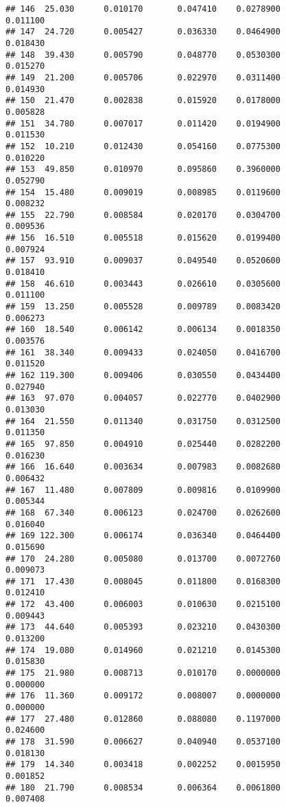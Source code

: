 \documentclass[
]{article}
\begin{document}
\begin{verbatim}
## 146  25.030      0.010170       0.047410    0.0278900          0.011100
## 147  24.720      0.005427       0.036330    0.0464900          0.018430
## 148  39.430      0.005790       0.048770    0.0530300          0.015270
## 149  21.200      0.005706       0.022970    0.0311400          0.014930
## 150  21.470      0.002838       0.015920    0.0178000          0.005828
## 151  34.780      0.007017       0.011420    0.0194900          0.011530
## 152  10.210      0.012430       0.054160    0.0775300          0.010220
## 153  49.850      0.010970       0.095860    0.3960000          0.052790
## 154  15.480      0.009019       0.008985    0.0119600          0.008232
## 155  22.790      0.008584       0.020170    0.0304700          0.009536
## 156  16.510      0.005518       0.015620    0.0199400          0.007924
## 157  93.910      0.009037       0.049540    0.0520600          0.018410
## 158  46.610      0.003443       0.026610    0.0305600          0.011100
## 159  13.250      0.005528       0.009789    0.0083420          0.006273
## 160  18.540      0.006142       0.006134    0.0018350          0.003576
## 161  38.340      0.009433       0.024050    0.0416700          0.011520
## 162 119.300      0.009406       0.030550    0.0434400          0.027940
## 163  97.070      0.004057       0.022770    0.0402900          0.013030
## 164  21.550      0.011340       0.031750    0.0312500          0.011350
## 165  97.850      0.004910       0.025440    0.0282200          0.016230
## 166  16.640      0.003634       0.007983    0.0082680          0.006432
## 167  11.480      0.007809       0.009816    0.0109900          0.005344
## 168  67.340      0.006123       0.024700    0.0262600          0.016040
## 169 122.300      0.006174       0.036340    0.0464400          0.015690
## 170  24.280      0.005080       0.013700    0.0072760          0.009073
## 171  17.430      0.008045       0.011800    0.0168300          0.012410
## 172  43.400      0.006003       0.010630    0.0215100          0.009443
## 173  44.640      0.005393       0.023210    0.0430300          0.013200
## 174  19.080      0.014960       0.021210    0.0145300          0.015830
## 175  21.980      0.008713       0.010170    0.0000000          0.000000
## 176  11.360      0.009172       0.008007    0.0000000          0.000000
## 177  27.480      0.012860       0.088080    0.1197000          0.024600
## 178  31.590      0.006627       0.040940    0.0537100          0.018130
## 179  14.340      0.003418       0.002252    0.0015950          0.001852
## 180  21.790      0.008534       0.006364    0.0061800          0.007408

\end{verbatim}
\end{document}
